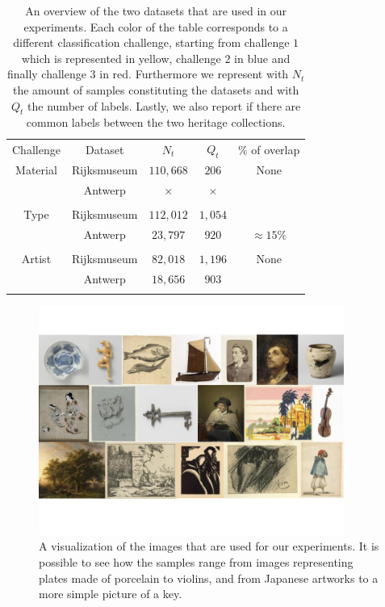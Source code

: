 \documentclass[runningheads]{llncs}
\begin{document}
\begin{table}[ht!]
\centering
\caption{An overview of the two datasets that are used in our experiments. Each color of the table corresponds to a different classification challenge, starting from challenge $1$ which is represented in yellow, challenge $2$ in blue and finally challenge $3$ in red. 
Furthermore we represent with $N_t$ the amount of samples constituting the datasets and with $Q_t$ the number of labels. Lastly, we also report if there are common labels between the two heritage collections.}
 \label{table:dataset_overview}
    \begin{tabu}to  
        Challenge & Dataset & \textbf{$N_t$} & \textbf{$Q_t$} & $\%$ of overlap \\
        Material & Rijksmuseum  & $110,668$ & $206$ & None \\ 
         & Antwerp & $\times$ & $\times$    \\
        \\
        Type & Rijksmuseum  & $112,012$ & $1,054$   \\
         & Antwerp & $23,797$ & $920$ & $\approx 15\%$ \\
        \\
        Artist & Rijksmuseum & $82,018$ & $1,196$  & None \\ 
         & Antwerp  & $18,656$ & $903$ \\        
        \\
    \end{tabu}
\end{table}   

\begin{figure}
\centering
  \includegraphics[width=10cm]{./images/datasets.jpg}\vspace{-1cm}
  \caption{A visualization of the images that are used for our experiments. It is possible to see how the samples range from images representing plates made of porcelain to violins, and from Japanese artworks to a more simple picture of a key.}
  \label{fig:datasets}
\end{figure}
\end{document}
